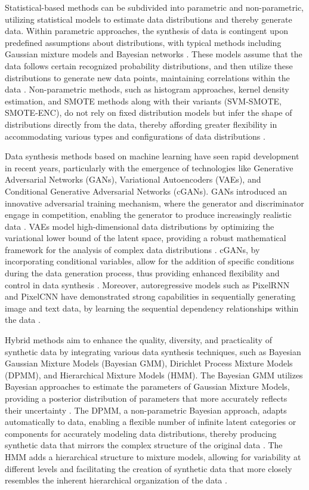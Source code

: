 \documentclass[lettersize,journal]{IEEEtran}
\begin{document}
Statistical-based methods can be subdivided into parametric and 
non-parametric, utilizing statistical models to estimate data 
distributions and thereby generate data. Within parametric approaches, 
the synthesis of data is contingent upon predefined assumptions about 
distributions, with typical methods including Gaussian mixture models 
and Bayesian networks \cite{bib26,bib27}. These models assume that the data 
follows certain recognized probability distributions, and then utilize these 
distributions to generate new data points, maintaining correlations 
within the data \cite{bib28,bib30}. Non-parametric methods, 
such as histogram approaches, kernel density estimation, and SMOTE 
methods along with their variants (SVM-SMOTE, SMOTE-ENC), do not rely 
on fixed distribution models but infer the shape of distributions 
directly from the data, thereby affording greater flexibility in 
accommodating various types and configurations of data distributions 
\cite{bib31,bib32,bib33,bib34,bib35}.

Data synthesis methods based on machine learning have seen rapid 
development in recent years, particularly with the emergence of 
technologies like Generative Adversarial Networks (GANs), Variational 
Autoencoders (VAEs), and Conditional Generative Adversarial Networks 
(cGANs). GANs introduced an innovative adversarial training mechanism, 
where the generator and discriminator engage in competition, enabling 
the generator to produce increasingly realistic data \cite{bib36,bib37,bib38}. VAEs 
model high-dimensional data distributions by optimizing the 
variational lower bound of the latent space, providing a robust 
mathematical framework for the analysis of complex data 
distributions \cite{bib39,bib40}. cGANs, by incorporating conditional variables, 
allow for the addition of specific conditions during the data 
generation process, thus providing enhanced flexibility and control 
in data synthesis \cite{bib41,bib42}. Moreover, autoregressive models such as 
PixelRNN and PixelCNN have demonstrated strong capabilities in 
sequentially generating image and text data, by learning the 
sequential dependency relationships within the data \cite{bib43,bib44}.

Hybrid methods aim to enhance the quality, diversity, and 
practicality of synthetic data by integrating various data synthesis 
techniques, such as Bayesian Gaussian Mixture Models (Bayesian GMM), 
Dirichlet Process Mixture Models (DPMM), and Hierarchical Mixture 
Models (HMM). The Bayesian GMM utilizes Bayesian approaches to 
estimate the parameters of Gaussian Mixture Models, providing a 
posterior distribution of parameters that more accurately reflects 
their uncertainty \cite{bib46,bib47}. The DPMM, a non-parametric Bayesian 
approach, adapts automatically to data, enabling a flexible number 
of infinite latent categories or components for accurately modeling 
data distributions, thereby producing synthetic data that mirrors 
the complex structure of the original data \cite{bib48,bib49}. The HMM adds a 
hierarchical structure to mixture models, allowing for variability 
at different levels and facilitating the creation of synthetic data 
that more closely resembles the inherent hierarchical organization of 
the data \cite{bib51}.
\end{document}

